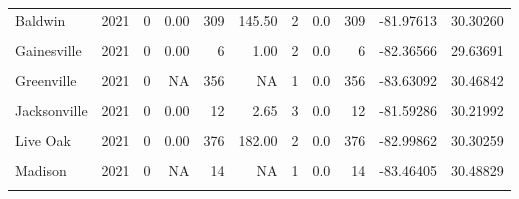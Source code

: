 \documentclass[12pt,final,CPage]{ufthesis}
\begin{document}
{\begin{table}[!h]
{\begin{tabular}[t]{lrrrrrrrrrr}
  Baldwin & 2021 & 0 & 0.00 & 309 & 145.50 & 2 & 0.0 & 309 & -81.97613 & 30.30260\\
  \cellcolor{gray!6}{Branford} & \cellcolor{gray!6}{2021} & \cellcolor{gray!6}{0} & \cellcolor{gray!6}{NA} & \cellcolor{gray!6}{12} & \cellcolor{gray!6}{NA} & \cellcolor{gray!6}{1} & \cellcolor{gray!6}{0.0} & \cellcolor{gray!6}{12} & \cellcolor{gray!6}{-82.92316} & \cellcolor{gray!6}{29.95685}\\
  Gainesville & 2021 & 0 & 0.00 & 6 & 1.00 & 2 & 0.0 & 6 & -82.36566 & 29.63691\\
  \cellcolor{gray!6}{Grand Ridge} & \cellcolor{gray!6}{2021} & \cellcolor{gray!6}{0} & \cellcolor{gray!6}{0.00} & \cellcolor{gray!6}{30} & \cellcolor{gray!6}{11.00} & \cellcolor{gray!6}{2} & \cellcolor{gray!6}{0.0} & \cellcolor{gray!6}{30} & \cellcolor{gray!6}{-85.04182} & \cellcolor{gray!6}{30.71944}\\
  \addlinespace
  Greenville & 2021 & 0 & NA & 356 & NA & 1 & 0.0 & 356 & -83.63092 & 30.46842\\
  \cellcolor{gray!6}{Greenwood} & \cellcolor{gray!6}{2021} & \cellcolor{gray!6}{0} & \cellcolor{gray!6}{NA} & \cellcolor{gray!6}{200} & \cellcolor{gray!6}{NA} & \cellcolor{gray!6}{1} & \cellcolor{gray!6}{0.0} & \cellcolor{gray!6}{200} & \cellcolor{gray!6}{-82.57149} & \cellcolor{gray!6}{28.00751}\\
  Jacksonville & 2021 & 0 & 0.00 & 12 & 2.65 & 3 & 0.0 & 12 & -81.59286 & 30.21992\\
  \cellcolor{gray!6}{Lake City} & \cellcolor{gray!6}{2021} & \cellcolor{gray!6}{49} & \cellcolor{gray!6}{9.80} & \cellcolor{gray!6}{472} & \cellcolor{gray!6}{77.72} & \cellcolor{gray!6}{5} & \cellcolor{gray!6}{9.8} & \cellcolor{gray!6}{521} & \cellcolor{gray!6}{-82.67590} & \cellcolor{gray!6}{30.12273}\\
  Live Oak & 2021 & 0 & 0.00 & 376 & 182.00 & 2 & 0.0 & 376 & -82.99862 & 30.30259\\
  \addlinespace
  \cellcolor{gray!6}{Macclenny} & \cellcolor{gray!6}{2021} & \cellcolor{gray!6}{0} & \cellcolor{gray!6}{NA} & \cellcolor{gray!6}{400} & \cellcolor{gray!6}{NA} & \cellcolor{gray!6}{1} & \cellcolor{gray!6}{0.0} & \cellcolor{gray!6}{400} & \cellcolor{gray!6}{-82.11797} & \cellcolor{gray!6}{30.28349}\\
  Madison & 2021 & 0 & NA & 14 & NA & 1 & 0.0 & 14 & -83.46405 & 30.48829\\
  \cellcolor{gray!6}{Marianna} & \cellcolor{gray!6}{2021} & \cellcolor{gray!6}{0} & \cellcolor{gray!6}{NA} & \cellcolor{gray!6}{11} & \cellcolor{gray!6}{NA} & \cellcolor{gray!6}{1} & \cellcolor{gray!6}{0.0} & \cellcolor{gray!6}{11} & \cellcolor{gray!6}{-85.20554} & \cellcolor{gray!6}{30.76829}\\

\end{tabular}}
\end{table}}
\end{document}
